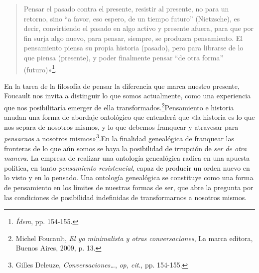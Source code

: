 \begin{quote}
Pensar el pasado contra el presente, resistir al presente, no para un retorno, sino ``a favor, eso espero, de un tiempo futuro'' (Nietzsche), es decir, convirtiendo el pasado en algo activo y presente afuera, para que por fin surja algo nuevo, para pensar, siempre, se produzca pensamiento. El pensamiento piensa su propia historia (pasado), pero para librarse de lo que piensa (presente), y poder finalmente pensar ``de otra forma'' (futuro)»\footnote{\emph{Ídem}, pp. 154-155.}.
\end{quote}

En la tarea de la filosofía de pensar la diferencia que marca nuestro presente, Foucault nos invita a distinguir lo que somos actualmente, como una experiencia que nos posibilitaría emerger de ella transformados.\footnote{Michel Foucault, \emph{El yo minimalista y otras conversaciones}, La marca editora, Buenos Aires, 2009, p. 13.}Pensamiento e historia anudan una forma de abordaje ontológico que entenderá que «la historia es lo que nos separa de nosotros mismos, y lo que debemos franquear y atravesar para \emph{pensarnos} a nosotros mismos»\footnote{Gilles Deleuze, \emph{Conversaciones\ldots{}}, \emph{op, cit}., pp. 154-155.}.En la finalidad genealógica de franquear las fronteras de lo que aún somos se haya la posibilidad de irrupción de \emph{ser de otra manera}. La empresa de realizar una ontología genealógica radica en una apuesta política, en tanto \emph{pensamiento resistencial}, capaz de producir un orden nuevo en lo visto y en lo pensado. Una ontología genealógica se constituye como una forma de pensamiento en los límites de nuestras formas de ser, que abre la pregunta por las condiciones de posibilidad indefinidas de transformarnos a nosotros mismos.

